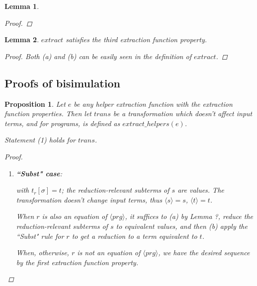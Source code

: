 \documentclass[11pt]{article} %
\newtheorem*{lemma*}{Lemma}
\newtheorem*{proposition*}{Proposition}
\begin{document}
\begin{framed}
\begin{lemma*}
\begin{proof}
\end{proof}

\end{lemma*}

\begin{lemma*}

$extract$ satisfies the third extraction function property.

\begin{proof}

Both (a) and (b) can be easily seen in the definition of $extract$.

\end{proof}

\end{lemma*}

\subsection*{Proofs of bisimulation}

\begin{proposition*}

Let $e$ be any helper extraction function with the extraction function properties. Then let $trans$ be a transformation which doesn't affect input terms, and for programs, is defined as $extract\_helpers(e)$.

Statement (1) holds for $trans$.

\begin{proof}

\begin{enumerate}
\item \textbf{``Subst" case}:

\begin{prooftree}
\end{prooftree}

with $t_r[\sigma] = t$; the reduction-relevant subterms of $s$ are values. The transformation doesn't change input terms, thus $\langle s \rangle = s$, $\langle t \rangle = t$.

When $r$ is also an equation of $\langle prg \rangle$, it suffices to (a) by Lemma ?, reduce the reduction-relevant subterms of $s$ to equivalent values, and then (b) apply the ``Subst" rule for $r$ to get a reduction to a term equivalent to $t$.

When, otherwise, $r$ is not an equation of $\langle prg \rangle$, we have the desired sequence by the first extraction function property.


\end{enumerate}
\end{proof}
\end{proposition*}
\end{framed}
\end{document}
